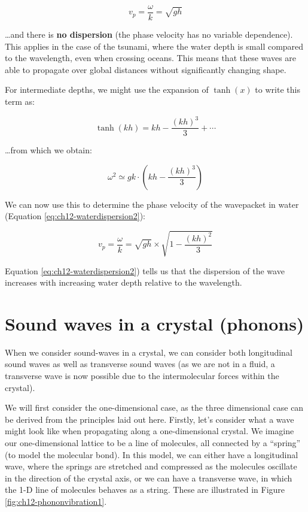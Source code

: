 \documentclass[
]{book}
\begin{document}
\begin{equation}
v_p = \frac{\omega}{k} = \sqrt{gh}
\end{equation}

\ldots and there is \textbf{no dispersion} (the phase velocity has no variable dependence). This applies in the case of the tsunami, where the water depth is small compared to the wavelength, even when crossing oceans. This means that these waves are able to propagate over global distances without significantly changing shape.

For intermediate depths, we might use the expansion of \(\tanh(x)\) to write this term as:

\begin{equation}
\tanh(kh) = kh - \frac{(kh)^3}{3} + \cdots
\end{equation}

\ldots from which we obtain:

\begin{equation}
\omega^2 \simeq gk \cdot \left(kh - \frac{(kh)^3}{3} \right)
\end{equation}

We can now use this to determine the phase velocity of the wavepacket in water (Equation \eqref{eq:ch12-waterdispersion2}):

\begin{equation}
v_p = \frac{\omega}{k} =\sqrt{gh} \times \sqrt{1-\frac{(kh)^2}{3}}
\label{eq:ch12-waterdispersion2}
\end{equation}

Equation \eqref{eq:ch12-waterdispersion2}) tells us that the dispersion of the wave increases with increasing water depth relative to the wavelength.

\hypertarget{sec-ch12-phonondispersion}{%
\section{Sound waves in a crystal (phonons)}\label{sec-ch12-phonondispersion}}

When we consider sound-waves in a crystal, we can consider both longitudinal sound waves as well as transverse sound waves (as we are not in a fluid, a transverse wave is now possible due to the intermolecular forces within the crystal).

We will first consider the one-dimensional case, as the three dimensional case can be derived from the principles laid out here. Firstly, let's consider what a wave might look like when propagating along a one-dimensional crystal. We imagine our one-dimensional lattice to be a line of molecules, all connected by a ``spring'' (to model the molecular bond). In this model, we can either have a longitudinal wave, where the springs are stretched and compressed as the molecules oscillate in the direction of the crystal axis, or we can have a transverse wave, in which the 1-D line of molecules behaves as a string. These are illustrated in Figure \ref{fig:ch12-phononvibration1}.
\end{document}
